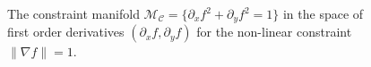 \documentclass[a4paper, 11pt]{article}
\begin{document}
\begin{figure}
\centering
\begin{subfigure}[b]{0.49\textwidth}
\end{subfigure}
\caption{The constraint manifold $\mathcal{M}_\mathcal{C}=\{\partial_xf^2+\partial_yf^2=1\}$ in the space of first order derivatives $(\partial_x f,\partial_yf)$ for the non-linear constraint $\|\nabla f\|=1$.}\label{fig:constraintManifold_example}
\end{figure}



\end{document}
